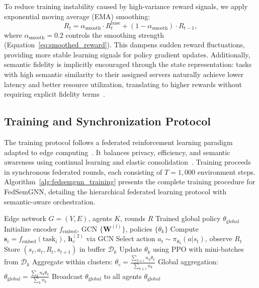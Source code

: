 \documentclass[conference]{IEEEtran}
\begin{document}
	To reduce training instability caused by high-variance reward signals, we apply exponential moving average (EMA) smoothing:
	\begin{equation}
		R_t = \alpha_{\text{smooth}} \cdot R_t^{\text{base}} + (1 - \alpha_{\text{smooth}}) \cdot R_{t-1},
		\label{eq:smoothed_reward}
	\end{equation}
	\textcolor{revblue}{where $\alpha_{\text{smooth}} = 0.2$ controls the smoothing strength (Equation~\ref{eq:smoothed_reward}). This dampens sudden reward fluctuations, providing more stable learning signals for policy gradient updates. Additionally, semantic fidelity is implicitly encouraged through the state representation: tasks with high semantic similarity to their assigned servers naturally achieve lower latency and better resource utilization, translating to higher rewards without requiring explicit fidelity terms~\cite{ji2024resource}.}
	
	\subsection{Training and Synchronization Protocol}
	
	The training protocol follows a federated reinforcement learning paradigm adapted to edge computing~\cite{grasso2022hhome, zhou2024qos}. It balances privacy, efficiency, and semantic awareness using continual learning and elastic consolidation~\cite{zhou2024robustfl}. Training proceeds in synchronous federated rounds, each consisting of $T = 1{,}000$ environment steps. Algorithm~\ref{alg:fedsemgnn_training} presents the complete training procedure for FedSemGNN, detailing the hierarchical federated learning protocol with semantic-aware orchestration.
	
	\begin{algorithm}[t]
		\caption{FedSemGNN Training Protocol}
		\label{alg:fedsemgnn_training}
		\begin{algorithmic}[1]
			\REQUIRE Edge network $G=(V,E)$, agents $K$, rounds $R$
			\ENSURE Trained global policy $\theta_{\text{global}}$
			\STATE Initialize encoder $f_{\text{embed}}$, GCN $\{\mathbf{W}^{(l)}\}$, policies $\{\theta_k\}$
			\STATE Compute $\mathbf{s}_i = f_{\text{embed}}(\text{task}_i)$, $\mathbf{h}_v^{(2)}$ via GCN
			\STATE Select action $a_t \sim \pi_{\theta_k}(a|s_t)$, observe $R_t$
			\STATE Store $(s_t, a_t, R_t, s_{t+1})$ in buffer $\mathcal{D}_k$
			\ENDFOR
			\STATE Update $\theta_k$ using PPO with mini-batches from $\mathcal{D}_k$
			\ENDFOR
			\STATE
			\STATE Aggregate within clusters: $\theta_c = \frac{\sum_{k \in c} n_k \theta_k}{\sum_{k \in c} n_k}$
			\ENDIF
			\STATE
			\STATE Global aggregation: $\theta_{\text{global}} = \frac{\sum_k n_k \theta_k}{\sum_k n_k}$
			\STATE Broadcast $\theta_{\text{global}}$ to all agents
			\ENDIF
			\ENDFOR
			\STATE
			\RETURN $\theta_{\text{global}}$
		\end{algorithmic}
	\end{algorithm}
	
\end{document}
